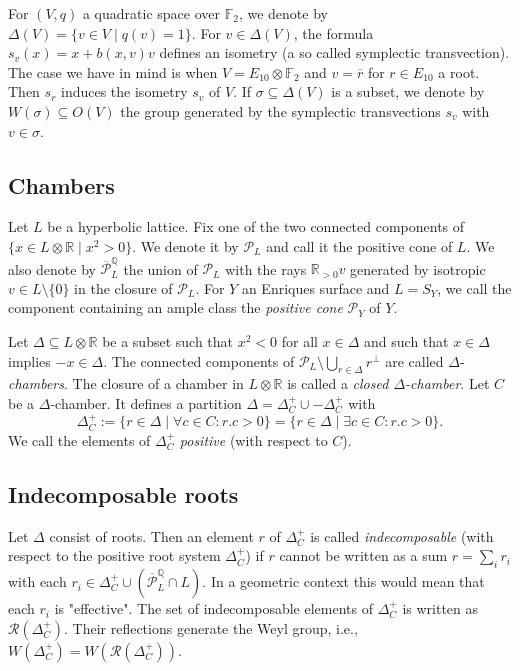 \documentclass[a4paper]{amsart}
\theoremstyle{definition}
\theoremstyle{plain}
\newcommand{\QQ}{\mathbb{Q}}
\newcommand{\FF}{\mathbb{F}}
\newcommand{\RR}{\mathbb{R}}
\renewcommand{\P}{\mathcal{P}}
\newcommand{\R}{\mathcal{R}}
\newcommand{\Pbar}{\overline{\P}^\mathbb{Q}}
\begin{document}
For $(V,q)$ a quadratic space over $\FF_2$, we denote by $\Delta(V)=\{v \in V \mid  q(v)=1\}$. For $v \in \Delta(V)$, the formula $s_v(x)= x + b(x,v)v$ defines an isometry (a so called symplectic transvection). 
The case we have in mind is when $V = E_{10}\otimes \FF_2$ and $v=\overline{r}$ for $r \in E_{10}$ a root. Then $s_r$ induces the isometry  $s_{v}$ of $V$.
If $\sigma \subseteq \Delta(V)$ is a subset, we denote by $W(\sigma)\subseteq O(V)$ the group generated by the symplectic transvections $s_v$ with $v \in \sigma$.

\subsection*{Chambers}
Let $L$ be a hyperbolic lattice. Fix one of the two connected components of $\{x \in L \otimes \RR \mid x^2>0\}$. We denote it by $\P_L$ and call it the positive cone of $L$. We also denote by $\overline{\P}^{\QQ}_L$ the union of $\P_L$ with the rays $\RR_{>0} v$ generated by isotropic $v\in L\setminus\{0\}$ in the closure of $\P_L$.
For $Y$ an Enriques surface and $L=S_Y$, we call the component containing an ample class the \emph{positive cone} $\P_Y$ of $Y$.

Let $\Delta \subseteq L \otimes \RR$ be a subset such that $x^2<0$ for all $x\in \Delta$ and such that $x \in \Delta$ implies $-x \in \Delta$.
The connected components of $\P_L\setminus \bigcup_{r \in \Delta} r^\perp$ are called $\Delta$-\emph{chambers}. The closure of a chamber in $L \otimes \RR$ is called a \emph{closed $\Delta$-chamber}. 
Let $C$ be a $\Delta$-chamber. It defines a partition $\Delta = \Delta^+_C \cup -\Delta^+_C$ with 
\[\Delta^+_C:=\{r \in \Delta \mid \forall c \in C \colon r.c > 0\} =\{r \in \Delta \mid \exists c \in C \colon r.c>0\}.\]
We call the elements of $\Delta^+_C$ \emph{positive} (with respect to $C$). 

\subsection*{Indecomposable roots}
Let $\Delta$ consist of roots. Then an element $r$ of $\Delta^+_C$ is called \emph{indecomposable} (with respect to the positive root system $\Delta^+_C$) if $r$ cannot be written as a sum $r = \sum_i r_i$ with each $r_i \in \Delta^+_C \cup (\Pbar_L \cap L)$. In a geometric context this would mean that each $r_i$ is "effective".
The set of indecomposable elements of $\Delta^+_C$ is written as $\R(\Delta^+_C)$. 
Their reflections generate the Weyl group, i.e., $W(\Delta^+_C) = W(\R(\Delta^+_C))$.
\end{document}

